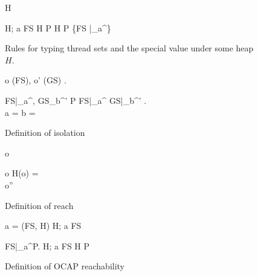 \begin{figure}
  {H \vdash \emptyset}

  \RuleSpace{}

  { H; a \vdash FS \andalso H \vdash P }
  { H \vdash P \cup \left\{FS |_a^\iota \right\} }

  \caption{Rules for typing thread sets and the special value \Error{} under some heap $H$.}
  \label{fig:ts_typing}
\end{figure}

\begin{figure}
  { 
    \forall o \in \accRoots(FS), o' \in \accRoots(GS) . \: 
  }
  {
  }
  
  \RuleSpace{}

  {
    \forall FS|_a^\iota, GS_b^{\iota'} \in P  FS|_a^\iota \neq
    GS|_b^{\iota'} . \\
    a = \ocap \: \lor \: b = \ocap \implies {}
  }
  {
  }
  \caption{Definition of isolation}
  \label{fig:def_isolation}
\end{figure}

\begin{figure}
  {o \in {}}
  {}

  \RuleSpace{}

  {
    o \in {} \andalso H(o) =  \\
    o'' \in {} \andalso {}
  }
  {  }
  \caption{Definition of reach}
  \label{fig:def_reach}
\end{figure}

%
%

\begin{figure}
  { a = \ocap \implies \ocrloc(FS, H) }
  { H; a \vdash FS \tsep \ocr }

  \RuleSpace{}

  {\forall FS|_a^\iota \in P. \: H; a \vdash FS \tsep \ocr}
  {H \vdash P \tsep \ocr}

  \caption{Definition of OCAP reachability}
  \label{fig:def_ocapreach}
\end{figure}


